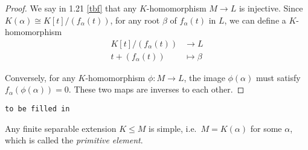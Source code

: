 \documentclass[a4paper]{article}
\begin{document}
\begin{proof}
  We say in 1.21 \ref{tbf} that any \(K\)-homomorphism \(M \to L\) is injective. Since \(K(\alpha) \cong K[t]/(f_\alpha(t))\), for any root \(\beta\) of \(f_\alpha(t)\) in \(L\), we can define a \(K\)-homomorphism
  \begin{align*}
    K[t]/(f_\alpha(t)) &\to L \\
    t + (f_\alpha(t)) &\mapsto \beta
  \end{align*}

  Conversely, for any \(K\)-homomorphism \(\phi: M \to L\), the image \(\phi(\alpha)\) must satisfy \(f_\alpha(\phi(\alpha)) = 0\). These two maps are inverses to each other.
\end{proof}

\texttt{to be filled in}

\blindtext
%
%
%
%
%

\begin{theorem}
  \label{thm:primitive}
  Any finite separable extension \(K \leq M\) is simple, i.e.\ \(M = K(\alpha)\) for some \(\alpha\), which is called the \emph{primitive element}.
\end{theorem}
\end{document}
